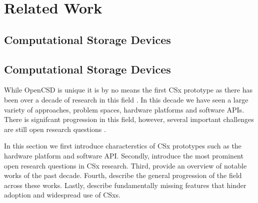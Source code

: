 
\chapter{Related Work} %



\ifpdf
    \graphicspath{{7/figures/PNG/}{7/figures/PDF/}{7/figures/}}
\else
    \graphicspath{{7/figures/EPS/}{7/figures/}}
\fi


% 

\section{Computational Storage Devices}

\section{Computational Storage Devices}

While OpenCSD is unique it is by no means the first CSx prototype as there
has been over a decade of research in this field \cite{lukken2021past}. In this
decade we have seen a large variety of approaches, problem spaces, hardware
platforms and software APIs. There is signifcant progression in this field, 
however, several important challenges are still open research
questions \cite{barbalacecomputational}.

In this section we first introduce characterstics of CSx prototypes such as the
hardware platform and software API. Secondly, introduce the most prominent open
research questions in CSx research. Third, provide an overview of notable works
of the past decade. Fourth, describe the general progression of the field across
these works. Lastly, describe fundamentally missing features that hinder
adoption and widespread use of CSxs.




